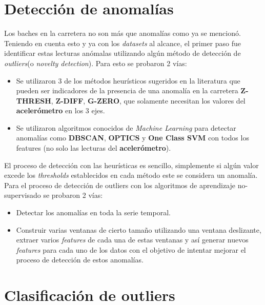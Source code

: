 \section{Detección de anomalías}
	Los baches en la carretera no son más que anomalías como ya se mencionó. Teniendo en cuenta esto y ya con los \emph
	{datasets} al alcance, el primer paso fue identificar estas lecturas anómalas utilizando algún método de detección de \emph
	{outliers}(o \emph{novelty detection}). Para esto se probaron 2 vías:\\

	\begin{itemize}
		\item Se utilizaron 3 de los métodos heurísticos sugeridos en la literatura que pueden ser indicadores de la presencia de una
			anomalía en la carretera \textbf{Z-THRESH}, \textbf{Z-DIFF}, \textbf{G-ZERO}, que solamente necesitan los valores
			del \textbf{acelerómetro} en los 3 ejes.
		\item Se utilizaron algoritmos conocidos de \emph{Machine Learning} para detectar anomalías como \textbf{DBSCAN},
			\textbf{OPTICS} y \textbf{One Class SVM} con todos los features (no solo las lecturas del \textbf{acelerómetro}).
	\end{itemize}

	El proceso de detección con las heurísticas es sencillo, simplemente si algún valor excede los \emph{thresholds} establecidos en 
	cada método este se considera un anomalía. Para el proceso de detección de outliers con los algoritmos de aprendizaje no-supervisado
	se probaron 2 vías: 

	\begin{itemize}
		\item Detectar los anomalías en toda la serie temporal.\\
		\item Construir varias ventanas de cierto tamaño utilizando una ventana deslizante, extraer varios \emph{features} de
			cada una de estas ventanas y así generar nuevos \emph {features} para cada uno de los datos con el objetivo de
			intentar mejorar el proceso de detección de estos anomalías.\\
	\end{itemize}
	

\section{Clasificación de outliers}


